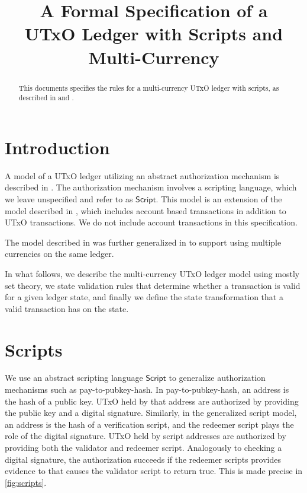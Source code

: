 \documentclass[11pt,a4paper]{article}
\newcommand{\type}[1]{\mathsf{#1}}
\newcommand{\Script}{\type{Script}}
\begin{document}
\title{A Formal Specification of a \\
       UTxO Ledger with Scripts and Multi-Currency}

\author{}


\maketitle

\begin{abstract}
This documents specifies the rules for a multi-currency UTxO ledger with scripts,
as described in \cite{multi_currency} and \cite{utxo_scripts}.
\end{abstract}

\tableofcontents
\listoffigures

\section{Introduction}

A model of a UTxO ledger utilizing an abstract authorization mechanism is
described in \cite{utxo_scripts}.  The authorization mechanism involves a
scripting language, which we leave unspecified and refer to as $\Script$.
This model is an extension of the model described in \cite{chimeric},
which includes account based transactions in addition to UTxO transactions.
We do not include account transactions in this specification.

The model described in \cite{utxo_scripts} was further generalized in
\cite{multi_currency} to support using multiple currencies on the same ledger.

In what follows, we describe the multi-currency UTxO ledger model using
mostly set theory, we state validation rules that determine whether a transaction
is valid for a given ledger state, and finally we define the state transformation
that a valid transaction has on the state.

\section{Scripts}

We use an abstract scripting language $\Script$ to generalize authorization
mechanisms such as pay-to-pubkey-hash.
In pay-to-pubkey-hash, an address is the hash of a public key.
UTxO held by that address are authorized by providing the public key
and a digital signature.
Similarly, in the generalized script model, an address
is the hash of a verification script, and the redeemer script
plays the role of the digital signature.
UTxO held by script addresses are authorized by providing both the validator
and redeemer script.  Analogously to checking a digital signature,
the authorization succeeds if the redeemer scripts provides evidence to
that causes the validator script to return true.
This is made precise in \cref{fig:scripts}.
\end{document}
